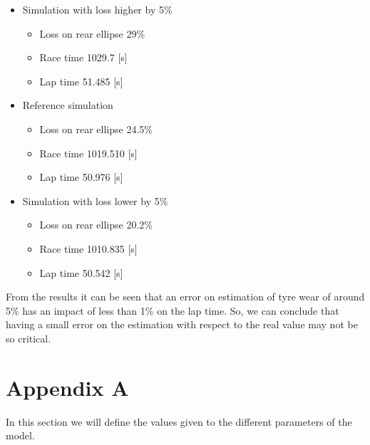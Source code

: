 \documentclass{report}
\begin{document}
\begin{itemize}
    \item   Simulation with loss higher by 5\%
            \begin{itemize}
                \item Loss on rear ellipse 29\%
                \item Race time 1029.7 [s]
                \item Lap time 51.485 [s]
            \end{itemize} 
    \item   Reference simulation
            \begin{itemize}
                \item Loss on rear ellipse 24.5\%
                \item Race time 1019.510 [s]
                \item Lap time 50.976 [s] 
            \end{itemize} 
    \item Simulation with loss lower by 5\%  
        \begin{itemize}
            \item Loss on rear ellipse 20.2\%
            \item Race time 1010.835 [s]
            \item Lap time 50.542 [s]
        \end{itemize}
\end{itemize}

From the results it can be seen that an error on estimation of tyre wear of around 5\% has an impact of less than 1\% on the lap time. So, we can conclude that having a small error on the estimation with respect to the real value may not be so critical.




\chapter{Appendix A}
In this section we will define the values given to the different parameters of the model. 
\end{document}
